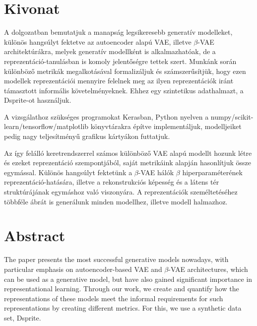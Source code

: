 \chapter*{Kivonat}

A dolgozatban bemutatjuk a manapság legsikeresebb generatív modelleket, különös hangsúlyt fektetve az autoencoder alapú VAE, illetve $\beta$-VAE architektúrákra, melyek generatív modellként is alkalmazhatóak, de a reprezentáció-tanulásban is komoly jelentőségre tettek szert. Munkánk során különböző metrikák megalkotásával formalizáljuk és számszerűsítjük, hogy ezen modellek reprezentációi mennyire felelnek meg az ilyen reprezentációk iránt támasztott informális követelményeknek. Ehhez egy szintetikus adathalmazt, a Dsprite-ot használjuk.

A vizsgálathoz szükséges programokat Kerasban, Python nyelven a numpy/scikit-learn/tensorflow/matplotlib könyvtárakra építve implementáljuk, modelljeiket pedig nagy teljesítményű grafikus kártyákon futtatjuk. 

Az így felálló keretrendszerrel számos különböző VAE alapú modellt hozunk létre és ezeket reprezentáció szempontjából, saját metrikáink alapján hasonlítjuk össze egymással. Különös hangsúlyt fektetünk a $\beta$-VAE hálók $\beta$ hiperparaméterének rep\-re\-zen\-táció-hatására, illetve a rekonstrukciós képesség és a látens tér struktúrájának egymáshoz való viszonyára. A reprezentációk személtetéséhez többféle ábrát is generálunk minden modellhez, illetve modell halmazhoz. 

\vfill

\chapter*{Abstract}

The paper presents the most successful generative models nowadays, with particular emphasis on autoencoder-based VAE and $\beta$-VAE architectures, which can be used as a generative model, but have also gained significant importance in representational learning. Through our work, we create and quantify how the representations of these models meet the informal requirements for such representations by creating different metrics. For this, we use a synthetic data set, Dsprite.

